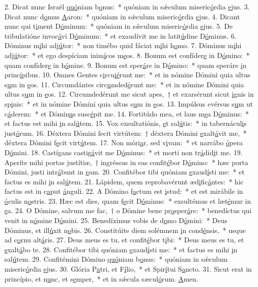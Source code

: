 2. Dicat nunc Israël \uline{quó}niam b\uline{o}nus:~* quóniam in sǽculum miseric\uline{ó}rdia \uline{e}jus.
3. Dicat nunc d\uline{o}mus \uline{A}aron:~* quóniam in sǽculum miseric\uline{ó}rdia \uline{e}jus.
4. Dicant nunc qui t\uline{i}ment D\uline{ó}minum:~* quóniam in sǽculum miseric\uline{ó}rdia \uline{e}jus.
5. De tribulatióne invoc\uline{á}vi D\uline{ó}minum:~* et exaudívit me in latit\uline{ú}dine D\uline{ó}minus.
6. Dóminus m\uline{i}hi adj\uline{ú}tor:~* non timébo quid fáciat m\uline{i}hi h\uline{o}mo.
7. Dóminus m\uline{i}hi adj\uline{ú}tor:~* et ego despíciam inim\uline{í}cos m\uline{e}os.
8. Bonum est confíder\uline{e} in D\uline{ó}mino:~* quam confíder\uline{e} in h\uline{ó}mine.
9. Bonum est sper\uline{á}re in D\uline{ó}mino:~* quam speráre \uline{i}n princ\uline{í}pibus.
10. Omnes Gentes c\uline{i}rcu\uline{ié}runt me:~* et in nómine Dómini quia ultus s\uline{u}m in \uline{e}os.
11. Circumdántes circ\uline{u}mded\uline{é}runt me:~* et in nómine Dómini quia ultus s\uline{u}m in \uline{e}os.
12. Circumdedérunt me sicut apes,~† et exarsérunt sicut \uline{i}gnis in sp\uline{i}nis:~* et in nómine Dómini quia ultus s\uline{u}m in \uline{e}os.
13. Impúlsus evérsus s\uline{u}m ut c\uline{á}derem:~* et Dómin\uline{u}s susc\uline{é}pit me.
14. Fortitúdo mea, et laus m\uline{e}a D\uline{ó}minus:~* et factus est mihi \uline{i}n sal\uline{ú}tem.
15. Vox exsultatiónis, \uline{e}t sal\uline{ú}tis:~* in tabernácul\uline{i}s just\uline{ó}rum.
16. Déxtera Dómini fecit virtútem:~† déxtera Dómini \uline{e}xalt\uline{á}vit me,~* déxtera Dómini f\uline{e}cit virt\uline{ú}tem.
17. Non móri\uline{a}r, sed v\uline{i}vam:~* et narrábo \uline{ó}pera D\uline{ó}mini.
18. Castígans castig\uline{á}vit me D\uline{ó}minus:~* et morti non tr\uline{á}did\uline{i}t me.
19. Aperíte mihi portas justítiæ,~† ingréssus in eas confit\uline{é}bor D\uline{ó}mino:~* hæc porta Dómini, justi intr\uline{á}bunt in \uline{e}am.
20. Confitébor tibi quóniam \uline{e}xaud\uline{í}sti me:~* et factus es mihi \uline{i}n sal\uline{ú}tem.
21. Lápidem, quem reprobavérunt æd\uline{i}fic\uline{á}ntes:~* hic factus est in c\uline{a}put \uline{á}nguli.
22. A Dómino f\uline{a}ctum est \uline{i}stud:~* et est mirábile in \uline{ó}culis n\uline{o}stris.
23. Hæc est dies, quam f\uline{e}cit D\uline{ó}minus:~* exsultémus et læt\uline{é}mur in \uline{e}a.
24. O Dómine, salvum me fac,~† o Dómine bene pr\uline{o}sper\uline{á}re:~* benedíctus qui venit in n\uline{ó}mine D\uline{ó}mini.
25. Benedíximus vobis de d\uline{o}mo D\uline{ó}mini:~* Deus Dóminus, et ill\uline{ú}xit n\uline{o}bis.
26. Constitúite diem solémnem \uline{i}n cond\uline{é}nsis,~* usque ad c\uline{o}rnu alt\uline{á}ris.
27. Deus meus es tu, et confit\uline{é}bor t\uline{i}bi:~* Deus meus es tu, et \uline{e}xalt\uline{á}bo te.
28. Confitébor tibi quóniam \uline{e}xaud\uline{í}sti me:~* et factus es mihi \uline{i}n sal\uline{ú}tem.
29. Confitémini Dómino \uline{quó}niam b\uline{o}nus:~* quóniam in sǽculum miseric\uline{ó}rdia \uline{e}jus.
30. Glória P\uline{a}tri, et F\uline{í}lio,~* et Spir\uline{í}tui S\uline{a}ncto.
31. Sicut erat in princípio, et n\uline{u}nc, et s\uline{e}mper,~* et in sǽcula sæcul\uline{ó}rum. \uline{A}men.
